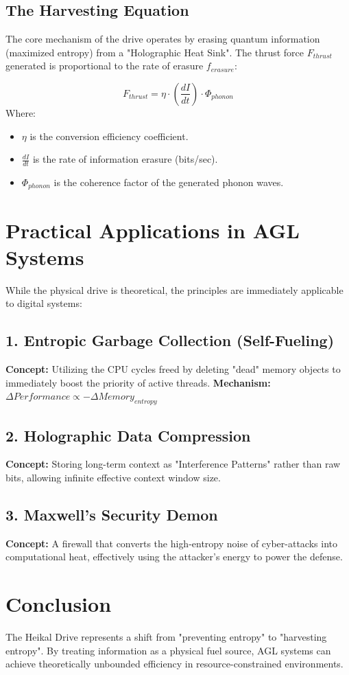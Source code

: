 \documentclass{article}
\begin{document}
\subsection{The Harvesting Equation}
The core mechanism of the drive operates by erasing quantum information (maximized entropy) from a "Holographic Heat Sink". The thrust force $F_{thrust}$ generated is proportional to the rate of erasure $f_{erasure}$:

\begin{equation}
    F_{thrust} = \eta \cdot \left( \frac{dI}{dt} \right) \cdot \Phi_{phonon}
\end{equation}
Where:
\begin{itemize}
    \item $\eta$ is the conversion efficiency coefficient.
    \item $\frac{dI}{dt}$ is the rate of information erasure (bits/sec).
    \item $\Phi_{phonon}$ is the coherence factor of the generated phonon waves.
\end{itemize}

\section{Practical Applications in AGL Systems}

While the physical drive is theoretical, the principles are immediately applicable to digital systems:

\subsection{1. Entropic Garbage Collection (Self-Fueling)}
\textbf{Concept:} Utilizing the CPU cycles freed by deleting "dead" memory objects to immediately boost the priority of active threads.
\textbf{Mechanism:} $ \Delta Performance \propto -\Delta Memory_{entropy} $

\subsection{2. Holographic Data Compression}
\textbf{Concept:} Storing long-term context as "Interference Patterns" rather than raw bits, allowing infinite effective context window size.

\subsection{3. Maxwell's Security Demon}
\textbf{Concept:} A firewall that converts the high-entropy noise of cyber-attacks into computational heat, effectively using the attacker's energy to power the defense.

\section{Conclusion}
The Heikal Drive represents a shift from "preventing entropy" to "harvesting entropy". By treating information as a physical fuel source, AGL systems can achieve theoretically unbounded efficiency in resource-constrained environments.
\end{document}
